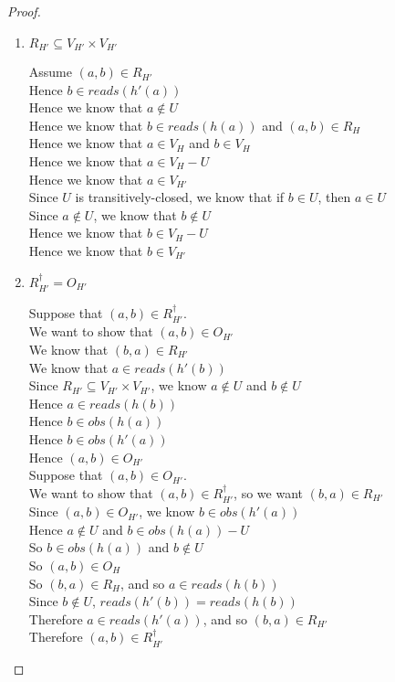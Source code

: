 \begin{proof}
\begin{enumerate}
\item $R_{H'} \subseteq V_{H'} \times V_{H'}$
  \begin{tabbedproof}
    \oo Assume $(a,b) \in R_{H'}$ \\
    \oo Hence $b \in \mathit{reads}(h'(a))$ \\
    \oo Hence we know that $a \not\in U$ \\
    \oo Hence we know that $b \in \mathit{reads}(h(a))$ and $(a,b) \in R_H$\\
    \oo Hence we know that $a \in V_H$ and $b \in V_H$\\
    \oo Hence we know that $a \in V_H - U$ \\
    \oo Hence we know that $a \in V_{H'}$ \\
    \oo Since $U$ is transitively-closed, we know that if $b \in U$, then $a \in U$ \\
    \oo Since $a \not\in U$, we know that $b \not\in U$ \\
    \oo Hence we know that $b \in V_H - U$ \\
    \oo Hence we know that $b \in V_{H'}$ 
  \end{tabbedproof}

\item $R^\dagger_{H'} = O_{H'}$ 
  \begin{tabbedproof}
    \oo Suppose that $(a, b) \in R^\dagger_{H'}$. \\
    \ooo We want to show that $(a, b) \in O_{H'}$ \\
    \ooo We know that $(b, a) \in R_{H'}$ \\
    \ooo We know that $a \in \mathit{reads}(h'(b))$ \\
    \ooo Since $R_{H'} \subseteq V_{H'} \times V_{H'}$, we know $a \not\in U$ and $b \not \in U$ \\
    \ooo Hence $a \in \mathit{reads}(h(b))$ \\ 
    \ooo Hence $b \in \mathit{obs}(h(a))$ \\
    \ooo Hence $b \in \mathit{obs}(h'(a))$ \\
    \ooo Hence $(a,b) \in O_{H'}$ \\
    \oo Suppose that $(a, b) \in O_{H'}$. \\
    \ooo We want to show that $(a,b) \in R^\dagger_{H'}$, so we want $(b,a) \in R_{H'}$ \\
    \ooo Since $(a,b) \in O_{H'}$, we know $b \in \mathit{obs}(h'(a))$ \\
    \ooo Hence $a \not\in U$ and $b \in \mathit{obs}(h(a)) - U$ \\
    \ooo So $b \in \mathit{obs}(h(a))$ and $b \not \in U$ \\
    \ooo So $(a,b) \in O_H$ \\
    \ooo So $(b,a) \in R_H$, and so $a \in \mathit{reads}(h(b))$ \\
    \ooo Since $b \not\in U$, $\mathit{reads}(h'(b)) = \mathit{reads}(h(b))$ \\
    \ooo Therefore $a \in \mathit{reads}(h'(a))$, and so $(b,a) \in R_{H'}$ \\
    \ooo Therefore $(a,b) \in R^\dagger_{H'}$ 
  \end{tabbedproof}


\end{enumerate}
\end{proof}
